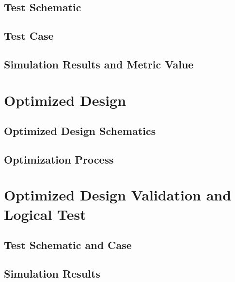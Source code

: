 \documentclass[12pt]{article}
\begin{document}
\subsection{Test Schematic}



\newpage

\subsection{Test Case}



\newpage

\subsection{Simulation Results and Metric Value}



\newpage

\section{Optimized Design}
\subsection{Optimized Design Schematics}



\newpage

\subsection{Optimization Process}



\newpage

\section{Optimized Design Validation and Logical Test}
\subsection{Test Schematic and Case}



\newpage

\subsection{Simulation Results}
\end{document}
